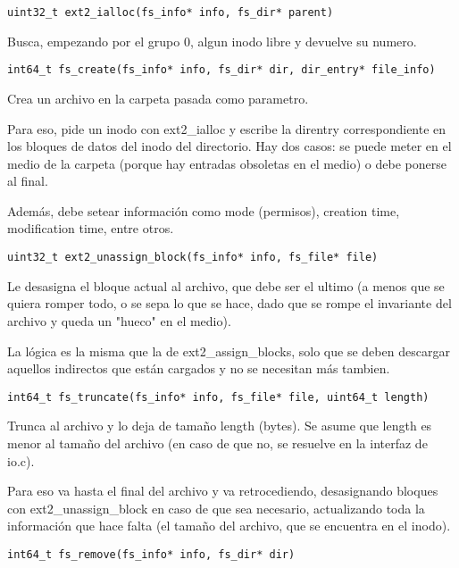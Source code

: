 \begin{lstlisting}[style=customc]
uint32_t ext2_ialloc(fs_info* info, fs_dir* parent)
\end{lstlisting}

Busca, empezando por el grupo 0, algun inodo libre y devuelve su numero. 

\begin{lstlisting}[style=customc]
int64_t fs_create(fs_info* info, fs_dir* dir, dir_entry* file_info)
\end{lstlisting}

Crea un archivo en la carpeta pasada como parametro.

Para eso, pide un inodo con ext2\_ialloc y escribe la direntry correspondiente en los bloques de datos del inodo del directorio. Hay dos casos: se puede meter en el medio de la carpeta (porque hay entradas obsoletas en el medio) o debe ponerse al final.

Además, debe setear información como mode (permisos), creation time, modification time, entre otros.

\begin{lstlisting}[style=customc]
uint32_t ext2_unassign_block(fs_info* info, fs_file* file)
\end{lstlisting}

Le desasigna el bloque actual al archivo, que debe ser el ultimo (a menos que se quiera romper todo, o se sepa lo que se hace, dado que se rompe el invariante del archivo y queda un "hueco" en el medio). 

La lógica es la misma que la de ext2\_assign\_blocks, solo que se deben descargar aquellos indirectos que están cargados y no se necesitan más tambien.

\begin{lstlisting}[style=customc]
int64_t fs_truncate(fs_info* info, fs_file* file, uint64_t length)
\end{lstlisting}

Trunca al archivo y lo deja de tamaño length (bytes). Se asume que length es menor al tamaño del archivo (en caso de que no, se resuelve en la interfaz de io.c).

Para eso va hasta el final del archivo y va retrocediendo, desasignando bloques con ext2\_unassign\_block en caso de que sea necesario, actualizando toda la información que hace falta (el tamaño del archivo, que se encuentra en el inodo).

\begin{lstlisting}[style=customc]
int64_t fs_remove(fs_info* info, fs_dir* dir)
\end{lstlisting}

